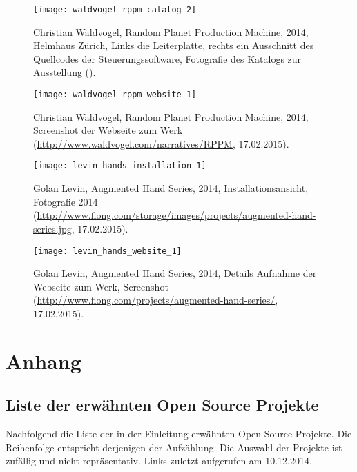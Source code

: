 \documentclass[
paper=164mm:234mm, %
pagesize, %
DIV=calc, %
10pt, %
parskip=half- %
]{scrbook}
\begin{document}
\begin{figure}[H]
	\centering
	\texttt{[image: waldvogel\_rppm\_catalog\_2]}
	\caption{Christian Waldvogel, Random Planet Production Machine, 2014, Helmhaus Zürich, Links die Leiterplatte, rechts ein Ausschnitt des Quellcodes der Steuerungssoftware, Fotografie des Katalogs zur Ausstellung (\cite[26-27]{Waldvogel:2014}).}
	\label{fig:waldvogel_rppm_catalog_2}
\end{figure}

\begin{figure}[H]
	\centering
	\texttt{[image: waldvogel\_rppm\_website\_1]}
	\caption{Christian Waldvogel, Random Planet Production Machine, 2014, Screenshot der Webseite zum Werk (\url{http://www.waldvogel.com/narratives/RPPM}, 17.02.2015).}
	\label{fig:waldvogel_rppm_Webseite_1}
\end{figure}

\begin{figure}[H]
	\centering
	\texttt{[image: levin\_hands\_installation\_1]}
	\caption{Golan Levin, Augmented Hand Series, 2014, Installationsansicht, Fotografie 2014 (\url{http://www.flong.com/storage/images/projects/augmented-hand-series.jpg}, 17.02.2015).}
	\label{fig:levin_hands_installation_1}
\end{figure}

\begin{figure}[H]
	\centering
	\texttt{[image: levin\_hands\_website\_1]}
	\caption{Golan Levin, Augmented Hand Series, 2014, Details Aufnahme der Webseite zum Werk, Screenshot  (\url{http://www.flong.com/projects/augmented-hand-series/}, 17.02.2015).}
	\label{fig:levin_hands_Webseite_1}
\end{figure}


\part*{Anhang}

{}
\chapter*{Liste der erwähnten Open Source Projekte}

Nachfolgend die Liste der in der Einleitung erwähnten Open Source Projekte. Die Reihenfolge entspricht derjenigen der Aufzählung. Die Auswahl der Projekte ist zufällig und nicht repräsentativ. Links zuletzt aufgerufen am 10.12.2014.
\end{document}
